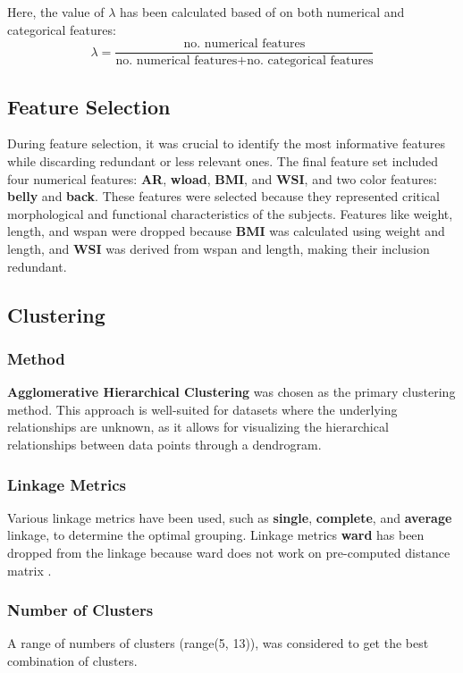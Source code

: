 Here, the value of $\lambda$ has been calculated based of on both numerical and categorical features: 
\begin{equation}
    \lambda = \frac{\text{no. numerical features}}{\text{no. numerical features} + \text{no. categorical features}}
\end{equation}



\subsection{Feature Selection}
During feature selection, it was crucial to identify the most informative features while discarding redundant or less relevant ones. The final feature set included four numerical features: \textbf{AR}, \textbf{wload}, \textbf{BMI}, and \textbf{WSI}, and two color features: \textbf{belly} and \textbf{back}. These features were selected because they represented critical morphological and functional characteristics of the subjects. Features like weight, length, and wspan were dropped because \textbf{BMI} was calculated using weight and length, and \textbf{WSI} was derived from wspan and length, making their inclusion redundant.

\subsection{Clustering}

\subsubsection{Method}
\textbf{Agglomerative Hierarchical Clustering} was chosen as the primary clustering method. This approach is well-suited for datasets where the underlying relationships are unknown, as it allows for visualizing the hierarchical relationships between data points through a dendrogram.

\subsubsection{Linkage Metrics}
Various linkage metrics have been used, such as \textbf{single}, \textbf{complete}, and \textbf{average} linkage, to determine the optimal grouping. Linkage metrics \textbf{ward} has been dropped from the linkage because ward does not work on pre-computed distance matrix \cite{sklearn_AgglomerativeClustering}.

\subsubsection{Number of Clusters}
A range of numbers of clusters (range(5, 13)), was considered to get the best combination of clusters.

